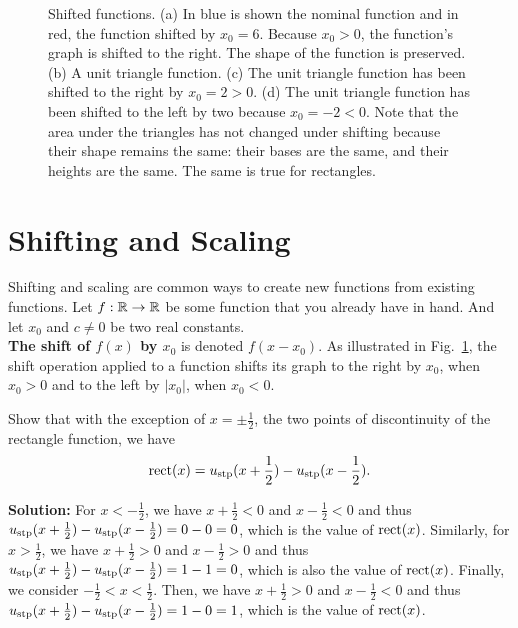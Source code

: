 \begin{figure}[htb!]
\caption[]{Shifted functions. (a) In blue is shown the nominal function and in red, the function shifted by $x_0 = 6$. Because $x_0>0$, the function's graph is shifted to the right. The shape of the function is preserved. (b) A unit triangle function. (c) The unit triangle function has been shifted to the right by $x_0=2 >0$. (d) The unit triangle function has been shifted to the left by two because $x_0=-2 <0$. Note that the area under the triangles has not changed under shifting because their shape remains the same: their bases are the same, and their heights are the same. The same is true for rectangles.}
    \label{fig:ShiftedFunctions}
\end{figure}

\section{Shifting and Scaling}
\label{sec:ShiftScale}

Shifting and scaling are common ways to create new functions from existing functions. Let $f:\mathbb R \to \mathbb R$ be some function that you already have in hand. And let $x_0$ and $c \neq 0$ be two real constants.\\

\textbf{The shift of $f(x)$ by $x_0 $} is denoted $f(x-x_0)$. As illustrated in Fig.~\ref{fig:ShiftedFunctions}, the shift operation applied to a function shifts its graph to the right by $x_0$, when $x_0 >0$ and to the left by $|x_0|$, when $x_0 < 0$.

\bigskip
\begin{example}
    Show that with the exception of $x = \pm \frac{1}{2}$, the two points of discontinuity of the rectangle function, we have
    $${\rm rect}(x) = u_{\rm stp}(x+\frac{1}{2}) -  u_{\rm stp}(x- \frac{1}{2}). $$
\end{example}
\textbf{Solution:}
For $x< - \frac{1}{2} $, we have $x+\frac{1}{2} <0$ and $x-\frac{1}{2} <0$ and thus $u_{\rm stp}(x+\frac{1}{2}) -  u_{\rm stp}(x- \frac{1}{2})= 0 - 0 = 0$, which is the value of ${\rm rect}(x)$. Similarly, for $x> \frac{1}{2} $, we have $x+\frac{1}{2} >0$ and $x-\frac{1}{2} >0$ and thus $u_{\rm stp}(x+\frac{1}{2}) -  u_{\rm stp}(x- \frac{1}{2})= 1 - 1 = 0$, which is also the value of ${\rm rect}(x)$. Finally, we consider $-\frac{1}{2} < x < \frac{1}{2} $. Then,  we have $x+\frac{1}{2} >0$ and $x-\frac{1}{2} <0$ and thus $u_{\rm stp}(x+\frac{1}{2}) -  u_{\rm stp}(x- \frac{1}{2})= 1 - 0 = 1$, which is the value of ${\rm rect}(x)$.\\

